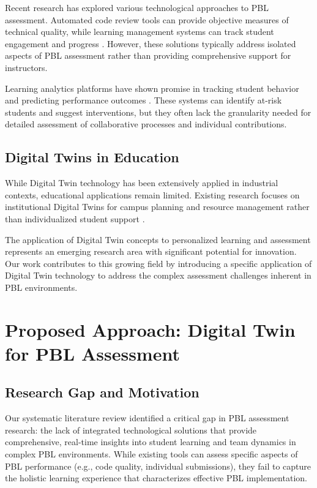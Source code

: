 \documentclass[review]{elsarticle}
\begin{document}
Recent research has explored various technological approaches to PBL assessment. Automated code review tools can provide objective measures of technical quality, while learning management systems can track student engagement and progress \cite{stegeman2018}. However, these solutions typically address isolated aspects of PBL assessment rather than providing comprehensive support for instructors.

Learning analytics platforms have shown promise in tracking student behavior and predicting performance outcomes \cite{mitchell2020}. These systems can identify at-risk students and suggest interventions, but they often lack the granularity needed for detailed assessment of collaborative processes and individual contributions.

\subsection{Digital Twins in Education}
\label{sec:dt_education}

While Digital Twin technology has been extensively applied in industrial contexts, educational applications remain limited. Existing research focuses on institutional Digital Twins for campus planning and resource management rather than individualized student support \cite{sheppard2023}.

The application of Digital Twin concepts to personalized learning and assessment represents an emerging research area with significant potential for innovation. Our work contributes to this growing field by introducing a specific application of Digital Twin technology to address the complex assessment challenges inherent in PBL environments.

\section{Proposed Approach: Digital Twin for PBL Assessment}
\label{sec:approach}

\subsection{Research Gap and Motivation}
\label{sec:gap}

Our systematic literature review identified a critical gap in PBL assessment research: the lack of integrated technological solutions that provide comprehensive, real-time insights into student learning and team dynamics in complex PBL environments. While existing tools can assess specific aspects of PBL performance (e.g., code quality, individual submissions), they fail to capture the holistic learning experience that characterizes effective PBL implementation.
\end{document}
